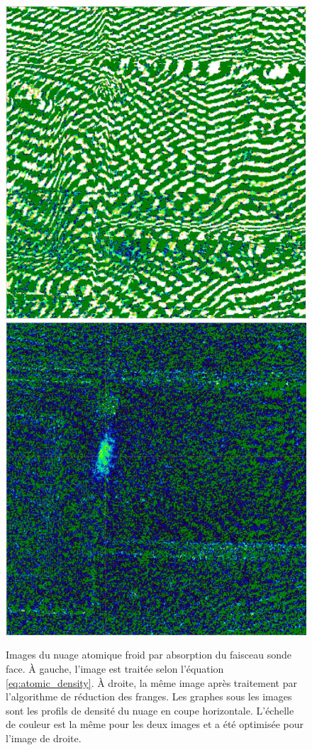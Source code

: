 \begin{figure}[!h]
\centering
\includegraphics[width=0.4\linewidth]{figures/setup/coldatoms/Normal_abs2_onlyPic}
\hfill%
\includegraphics[width=0.4\linewidth]{figures/setup/coldatoms/RF_abs2_onlyPic}
\caption[Effet de l'algorithme de réduction des franges]{
Images du nuage atomique froid par absorption du faisceau sonde face.
\`A gauche, l'image est traitée selon l'équation \eqref{eq:atomic_density}.
\`A droite, la même image après traitement par l'algorithme de réduction des franges.
Les graphes sous les images sont les profils de densité du nuage en coupe horizontale.
L'échelle de couleur est la même pour les deux images et a été optimisée pour l'image de droite.
}
\label{fig:Fringe_Reduction}
\end{figure}		

